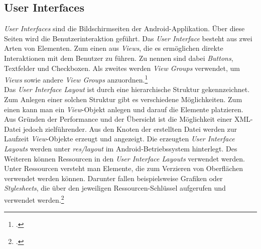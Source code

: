 \subsection{User Interfaces}
\label{ssec:android-ui}
\textit{User Interfaces} sind die Bildschirmseiten der \gls{Android}-Applikation. Über diese Seiten wird die Benutzerinteraktion geführt. Das \textit{User Interface} besteht aus zwei Arten von Elementen. Zum einen aus \textit{Views}, die es ermöglichen direkte Interaktionen mit dem Benutzer zu führen. Zu nennen sind dabei \textit{Buttons}, Textfelder und Checkboxen. Als zweites werden \textit{View Groups} verwendet, um \textit{Views} sowie andere \textit{View Groups} anzuordnen.\footcite[S. 40f.]{Android-BeckerPant}\\
Das \textit{User Interface Layout} ist durch eine hierarchische Struktur gekennzeichnet. Zum Anlegen einer solchen Struktur gibt es verschiedene Möglichkeiten. Zum einen kann man ein \textit{View}-Objekt anlegen und darauf die Elemente platzieren. Aus Gründen der Performance und der Übersicht ist die Möglichkeit einer \ac{XML}-Datei jedoch zielführender. Aus den Knoten der erstellten Datei werden zur Laufzeit \textit{View}-Objekte erzeugt und angezeigt. Die erzeugten \textit{User Interface Layouts} werden unter \textit{res/layout} im \gls{Android}-Betriebssystem hinterlegt. Des Weiteren können Ressourcen in den \textit{User Interface Layouts} verwendet werden. Unter Ressourcen versteht man Elemente, die zum Verzieren von Oberflächen verwendet werden können. Darunter fallen beispielsweise Grafiken oder \textit{Stylesheets}, die über den jeweiligen Ressourcen-Schlüssel aufgerufen und verwendet werden.\footcite{Android-UI}
